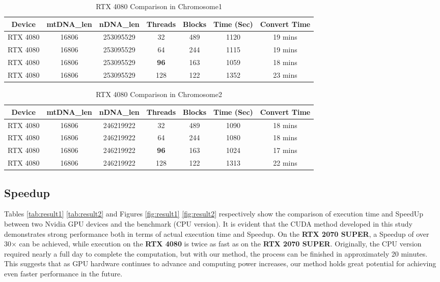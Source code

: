 \documentclass[PhD]{PHlab-thesis}
\begin{document}
\begin{table}[h]
    \centering
    \caption{RTX 4080 Comparison in Chromosome1}
    \label{tab:40801}
    \begin{tabular}{|c|c|c|c|c|c|c|}
        \hline
         \textbf{Device} & \textbf{mtDNA\_len}& \textbf{nDNA\_len}& \textbf{Threads} & \textbf{Blocks} & \textbf{Time (Sec)} & \textbf{Convert Time} \\
        \hline
         RTX 4080 & 16806 & 253095529 & 32 & 489 & 1120 & 19 mins \\
        \hline
         RTX 4080 & 16806 & 253095529 & 64 & 244 & 1115 & 19 mins \\
        \hline
         \rowcolor{yellow}
         RTX 4080 & 16806 & 253095529 & \textbf{96} & 163 & 1059 & 18 mins \\
        \hline
         RTX 4080 & 16806 & 253095529 & 128 & 122 & 1352 & 23 mins \\
         \hline
    \end{tabular}
\end{table}

\begin{table}[h]
    \centering
    \caption{RTX 4080 Comparison in Chromosome2}
    \label{tab:40802}
    \begin{tabular}{|c|c|c|c|c|c|c|}
        \hline
         \textbf{Device} & \textbf{mtDNA\_len}& \textbf{nDNA\_len}& \textbf{Threads} & \textbf{Blocks} & \textbf{Time (Sec)} & \textbf{Convert Time} \\
        \hline
         RTX 4080 & 16806 & 246219922 & 32 & 489 & 1090 & 18 mins \\
        \hline
         RTX 4080 & 16806 & 246219922 & 64 & 244 & 1080 & 18 mins \\
        \hline
         \rowcolor{yellow}
         RTX 4080 & 16806 & 246219922 & \textbf{96} & 163 & 1024 & 17 mins \\
        \hline
         RTX 4080 & 16806 & 246219922 & 128 & 122 & 1313 & 22 mins \\
         \hline
    \end{tabular}
\end{table}

\clearpage
\subsection{Speedup}
Tables \ref{tab:result1} \ref{tab:result2} and Figures \ref{fig:result1} \ref{fig:result2} respectively show the comparison of execution time and SpeedUp between two Nvidia GPU devices and the benchmark (CPU version). It is evident that the CUDA method developed in this study demonstrates strong performance both in terms of actual execution time and Speedup. On the \textbf{RTX 2070 SUPER}, a Speedup of over 30× can be achieved, while execution on the \textbf{RTX 4080} is twice as fast as on the \textbf{RTX 2070 SUPER}. Originally, the CPU version required nearly a full day to complete the computation, but with our method, the process can be finished in approximately 20 minutes. This suggests that as GPU hardware continues to advance and computing power increases, our method holds great potential for achieving even faster performance in the future.
\end{document}
